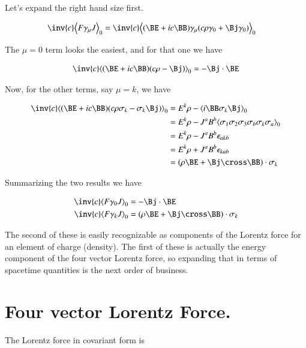 \documentclass{article}
\begin{document}
Let's expand the right hand size first.

\begin{align*}
\inv{c} \gpgradezero{ F \gamma_\mu J } &= \inv{c} \gpgradezero{ (\BE + i c \BB) \gamma_\mu (c \rho \gamma_0 + \Bj \gamma_0) } 
\end{align*}

The $\mu = 0$ term looks the easiest, and for that one we have

\begin{align*}
\inv{c} \gpgradezero{ (\BE + i c \BB) (c \rho - \Bj) }  = -\Bj \cdot \BE
\end{align*}

Now, for the other terms, say $\mu = k$, we have

\begin{align*}
\inv{c} \gpgradezero{ (\BE + i c \BB) (c \rho \sigma_k - \sigma_k \Bj ) } 
&= E^k \rho - \gpgradezero{ i \BB \sigma_k \Bj }  \\
&= E^k \rho - J^a B^b \gpgradezero{ \sigma_1 \sigma_2 \sigma_3 \sigma_b \sigma_k \sigma_a }  \\
&= E^k \rho - J^a B^b \epsilon_{a k b} \\
&= E^k \rho + J^a B^b \epsilon_{k a b} \\
&= (\rho \BE + \Bj \cross \BB) \cdot \sigma_k
\end{align*}

Summarizing the two results we have

\begin{align}
\inv{c} \gpgradezero{ F \gamma_0 J } &= -\Bj \cdot \BE \\
\inv{c} \gpgradezero{ F \gamma_k J } &= (\rho \BE + \Bj \cross \BB) \cdot \sigma_k
\end{align}

The second of these is easily recognizable as components of the Lorentz force for an element of charge (density).  The first
of these is actually the energy component of the four vector Lorentz force, so expanding that in terms of spacetime quantities
is the next order of business.

\section{ Four vector Lorentz Force. }

The Lorentz force in covariant form is

%
\end{document}
